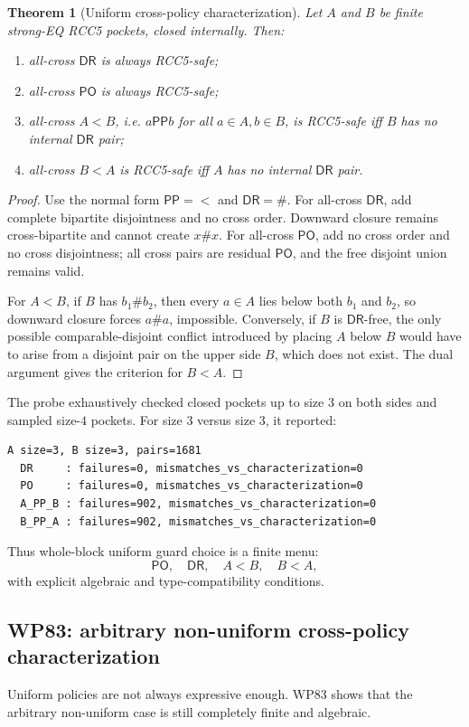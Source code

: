 \documentclass[11pt]{article}
\newtheorem{theorem}{Theorem}[section]
\newcommand{\PP}{\mathsf{PP}}
\newcommand{\PO}{\mathsf{PO}}
\newcommand{\DR}{\mathsf{DR}}
\begin{document}
\begin{theorem}[Uniform cross-policy characterization]
Let $A$ and $B$ be finite strong-EQ RCC5 pockets, closed internally.  Then:
\begin{enumerate}
\item all-cross $\DR$ is always RCC5-safe;
\item all-cross $\PO$ is always RCC5-safe;
\item all-cross $A<B$, i.e. $a\PP b$ for all $a\in A,b\in B$, is RCC5-safe iff $B$ has no internal $\DR$ pair;
\item all-cross $B<A$ is RCC5-safe iff $A$ has no internal $\DR$ pair.
\end{enumerate}
\end{theorem}

\begin{proof}
Use the normal form $\PP=<$ and $\DR=\#$.  For all-cross $\DR$, add complete bipartite disjointness and no cross order.  Downward closure remains cross-bipartite and cannot create $x\#x$.  For all-cross $\PO$, add no cross order and no cross disjointness; all cross pairs are residual $\PO$, and the free disjoint union remains valid.

For $A<B$, if $B$ has $b_1\# b_2$, then every $a\in A$ lies below both $b_1$ and $b_2$, so downward closure forces $a\# a$, impossible.  Conversely, if $B$ is $\DR$-free, the only possible comparable-disjoint conflict introduced by placing $A$ below $B$ would have to arise from a disjoint pair on the upper side $B$, which does not exist.  The dual argument gives the criterion for $B<A$.
\end{proof}

The probe exhaustively checked closed pockets up to size $3$ on both sides and sampled size-$4$ pockets.  For size $3$ versus size $3$, it reported:
\begin{verbatim}
A size=3, B size=3, pairs=1681
  DR     : failures=0, mismatches_vs_characterization=0
  PO     : failures=0, mismatches_vs_characterization=0
  A_PP_B : failures=902, mismatches_vs_characterization=0
  B_PP_A : failures=902, mismatches_vs_characterization=0
\end{verbatim}
Thus whole-block uniform guard choice is a finite menu:
\[
\PO,\quad \DR,\quad A<B,\quad B<A,
\]
with explicit algebraic and type-compatibility conditions.

\subsection{WP83: arbitrary non-uniform cross-policy characterization}
Uniform policies are not always expressive enough.  WP83 shows that the arbitrary non-uniform case is still completely finite and algebraic.
\end{document}
